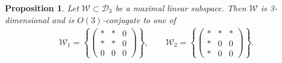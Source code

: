 \documentclass[pdftex]{sigma}
\def\W{\mathscr{W}}
\def\D{\mathcal{D}}
\newtheorem{Proposition}[Theorem]{Proposition}
\numberwithin{equation}{section}
\begin{document}
\begin{Proposition} \label{sing3max}
Let $\W\subset \D_3$ be a maximal linear subspace. Then $\W$ is 3-dimensional and is $O(3)$-conjugate to one of
\begin{gather*}
 \W_1 = \left\{\!\! \begin{pmatrix} * & * & 0 \\ * & * & 0 \\ 0 & 0 & 0\end{pmatrix}\!\! \right\} ,\qquad
\W_2 = \left\{\!\! \begin{pmatrix} * & * & * \\ * & 0 & 0 \\ * & 0 & 0\end{pmatrix}\!\! \right\} .
\end{gather*}
\end{Proposition}
\end{document}
